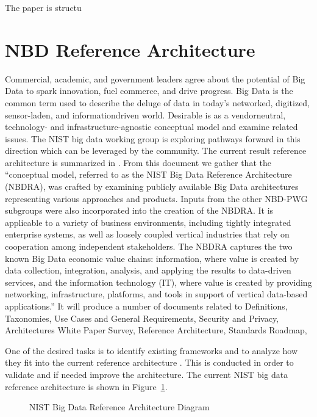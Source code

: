 The paper is structu

\section{NBD Reference Architecture}

Commercial, academic, and government leaders agree about the potential
of Big Data to spark innovation, fuel commerce, and drive
progress. Big Data is the common term used to describe the deluge of
data in today’s networked, digitized, sensor-laden, and
informationdriven world. Desirable is as a vendorneutral, technology-
and infrastructure-agnostic conceptual model and examine related
issues.  The NIST big data working group is exploring pathways forward
in this direction which can be leveraged by the community. The current
result reference architecture is summarized in \cite{nist-bd}. From
this document we gather that the ``conceptual model, referred to as
the NIST Big Data Reference Architecture (NBDRA), was crafted by
examining publicly available Big Data architectures representing
various approaches and products. Inputs from the other NBD-PWG
subgroups were also incorporated into the creation of the NBDRA. It is
applicable to a variety of business environments, including tightly
integrated enterprise systems, as well as loosely coupled vertical
industries that rely on cooperation among independent
stakeholders. The NBDRA captures the two known Big Data economic value
chains: information, where value is created by data collection,
integration, analysis, and applying the results to data-driven
services, and the information technology (IT), where value is created
by providing networking, infrastructure, platforms, and tools in
support of vertical data-based applications.'' It will produce a
number of documents related to Definitions, Taxonomies, Use Cases and
General Requirements, Security and Privacy, Architectures White Paper
Survey, Reference Architecture, Standards Roadmap,

One of the desired tasks is to identify existing frameworks and to
analyze how they fit into the current reference architecture
\cite{nist-bd}. This is conducted in order to validate and if needed
improve the architecture.  The current NIST big data reference
architecture is shown in Figure~\ref{F:NIST-arch}.

\begin{figure}[htb]
  \centering
  \caption{NIST Big Data Reference Architecture Diagram} 
  \label{F:NIST-arch}
\end{figure}


